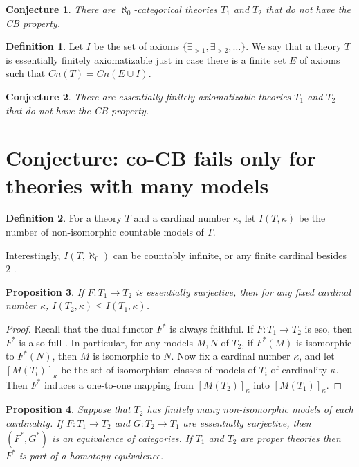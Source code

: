 \documentclass[12pt]{article}
\newtheorem{prop}{Proposition}
\newtheorem{conj}[prop]{Conjecture}
\theoremstyle{definition}
\newtheorem*{defn}{Definition}
\theoremstyle{remark}
\newcommand{\3}{\mathcal}
\begin{document}
\begin{conj} There are $\aleph _0$-categorical theories $T_1$ and
  $T_2$ that do not have the CB property. \end{conj}

\begin{defn} Let $I$ be the set of axioms
  $\{ \exists _{>1},\exists _{>2},\dots \}$. We say that a theory $T$
  is essentially finitely axiomatizable just in case there is a finite
  set $E$ of axioms such that $Cn(T)=Cn(E\cup I)$. \end{defn}

\begin{conj} There are essentially finitely axiomatizable theories
  $T_1$ and $T_2$ that do not have the CB property. \end{conj}

\section{Conjecture: co-CB fails only for theories with many models}

\begin{defn} For a theory $T$ and a cardinal number $\kappa$, let
  $I(T,\kappa )$ be the number of non-isomorphic countable models of
  $T$. \end{defn}

Interestingly, $I(T,\aleph _0)$ can be countably infinite, or any
finite cardinal besides $2$ \citep[see][p 155ff]{marker2006}.

\begin{prop} If $F:T_1\to T_2$ is essentially surjective, then for any
  fixed cardinal number $\kappa$,
  $I(T_2, \kappa )\leq I(T_1, \kappa )$. \end{prop}

\begin{proof} Recall that the dual functor $F^*$ is always
  faithful. If $F:T_1\to T_2$ is eso, then $F^*$ is also full
  \citep[Prop 6.6.13]{tlps}. In particular, for any models $M,N$ of
  $T_2$, if $F^*(M)$ is isomorphic to $F^*(N)$, then $M$ is isomorphic
  to $N$. Now fix a cardinal number $\kappa$, and let
  $[M(T_i)]_\kappa$ be the set of isomorphism classes of models of
  $T_i$ of cardinality $\kappa$. Then $F^*$ induces a one-to-one
  mapping from $[M(T_2)]_\kappa$ into $[M(T_1)]_\kappa$. \end{proof}

\begin{prop} Suppose that $T_2$ has finitely many non-isomorphic
  models of each cardinality. If $F:T_1\to T_2$ and $G:T_2\to T_1$ are
  essentially surjective, then $(F^*,G^*)$ is an equivalence of
  categories. If $T_1$ and $T_2$ are proper theories then $F^*$ is
  part of a homotopy equivalence. \end{prop}
\end{document}
